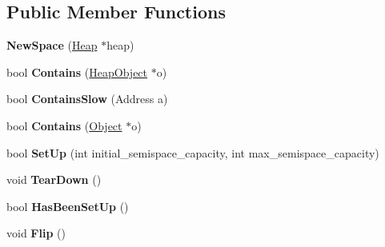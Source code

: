 \subsection*{Public Member Functions}
\begin{DoxyCompactItemize}
\item 
{\bfseries New\+Space} (\hyperlink{classv8_1_1internal_1_1_heap}{Heap} $\ast$heap)\hypertarget{classv8_1_1internal_1_1_new_space_ad27147487351e9aa2f5d9d4b54525997}{}\label{classv8_1_1internal_1_1_new_space_ad27147487351e9aa2f5d9d4b54525997}

\item 
bool {\bfseries Contains} (\hyperlink{classv8_1_1internal_1_1_heap_object}{Heap\+Object} $\ast$o)\hypertarget{classv8_1_1internal_1_1_new_space_af190d736985da39994ed68e87e8f6e63}{}\label{classv8_1_1internal_1_1_new_space_af190d736985da39994ed68e87e8f6e63}

\item 
bool {\bfseries Contains\+Slow} (Address a)\hypertarget{classv8_1_1internal_1_1_new_space_a1b7221040579582225dc9b7e919ffaf5}{}\label{classv8_1_1internal_1_1_new_space_a1b7221040579582225dc9b7e919ffaf5}

\item 
bool {\bfseries Contains} (\hyperlink{classv8_1_1internal_1_1_object}{Object} $\ast$o)\hypertarget{classv8_1_1internal_1_1_new_space_a3eb5dbab1f2ac9f6bc263e2e9549f5bf}{}\label{classv8_1_1internal_1_1_new_space_a3eb5dbab1f2ac9f6bc263e2e9549f5bf}

\item 
bool {\bfseries Set\+Up} (int initial\+\_\+semispace\+\_\+capacity, int max\+\_\+semispace\+\_\+capacity)\hypertarget{classv8_1_1internal_1_1_new_space_a4745c86effc54a55f82de892b228348e}{}\label{classv8_1_1internal_1_1_new_space_a4745c86effc54a55f82de892b228348e}

\item 
void {\bfseries Tear\+Down} ()\hypertarget{classv8_1_1internal_1_1_new_space_a3c260c86d0c22230141dcfa58bd291b2}{}\label{classv8_1_1internal_1_1_new_space_a3c260c86d0c22230141dcfa58bd291b2}

\item 
bool {\bfseries Has\+Been\+Set\+Up} ()\hypertarget{classv8_1_1internal_1_1_new_space_aa0b65ebe6da72afaf8654286124d5f9a}{}\label{classv8_1_1internal_1_1_new_space_aa0b65ebe6da72afaf8654286124d5f9a}

\item 
void {\bfseries Flip} ()\hypertarget{classv8_1_1internal_1_1_new_space_a2483751f06066ed3004a2cc72ec7fb9f}{}\label{classv8_1_1internal_1_1_new_space_a2483751f06066ed3004a2cc72ec7fb9f}


\end{DoxyCompactItemize}
